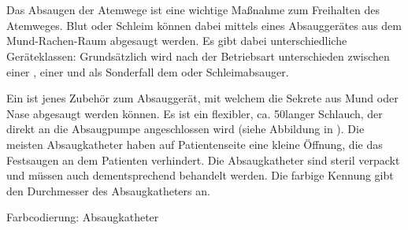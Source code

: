 \section{}

\label{topic:absaugkatheter}
\label{topic:absaugung-taetigkeit}
\label{topic:absaugung}
\label{topic:absauggeraete}


{
Das Absaugen der Atemwege ist eine wichtige Maßnahme zum Freihalten des Atemweges.
Blut oder Schleim können dabei mittels
eines Absauggerätes aus dem Mund-Rachen-Raum abgesaugt werden. Es
gibt dabei unterschiedliche Geräteklassen: Grundsätzlich wird nach der
Betriebsart unterschieden zwischen einer , einer  und als
Sonderfall dem  oder Schleimabsauger.

Ein  ist jenes Zubehör zum Absauggerät,
mit welchem die Sekrete aus Mund oder Nase abgesaugt werden
können. Es ist ein flexibler, ca. 50\CM* langer Schlauch,
der direkt an die Absaugpumpe angeschlossen wird (siehe
Abbildung in ). Die
meisten Absaugkatheter haben auf Patientenseite eine kleine
Öffnung, die das Festsaugen an dem Patienten verhindert. Die
Absaugkatheter sind steril verpackt und müssen auch
dementsprechend behandelt werden. Die farbige Kennung gibt
den Durchmesser des Absaugkatheters an. }
{}
{}
{}
{}



\TableWide
{Farbcodierung: Absaugkatheter}%
{}%
{\label{tab:absaugkatheter}}%
{}%
{}%
{%
}%
{}%


